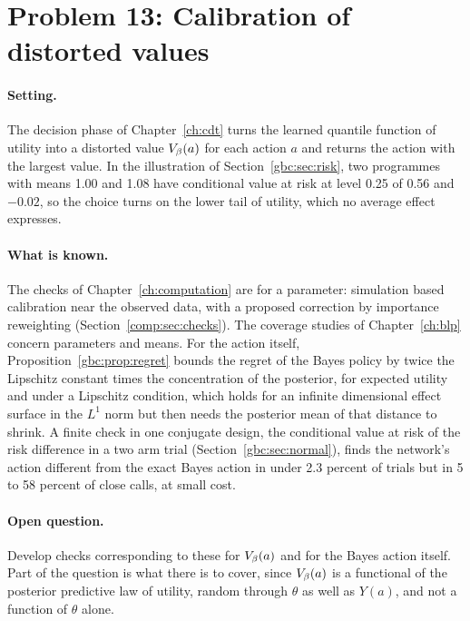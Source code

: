 \section{Problem 13: Calibration of distorted values}

\paragraph{Setting.} The decision phase of Chapter~\ref{ch:cdt} turns the learned quantile function of utility into a distorted value $V_{\beta}(a)$ for each action $a$ and returns the action with the largest value. In the illustration of Section~\ref{gbc:sec:risk}, two programmes with means 1.00 and 1.08 have conditional value at risk at level 0.25 of 0.56 and $-0.02$, so the choice turns on the lower tail of utility, which no average effect expresses.

\paragraph{What is known.} The checks of Chapter~\ref{ch:computation} are for a parameter: simulation based calibration near the observed data, with a proposed correction by importance reweighting (Section~\ref{comp:sec:checks}). The coverage studies of Chapter~\ref{ch:blp} concern parameters and means. For the action itself, Proposition~\ref{gbc:prop:regret} bounds the regret of the Bayes policy by twice the Lipschitz constant times the concentration of the posterior, for expected utility and under a Lipschitz condition, which holds for an infinite dimensional effect surface in the $L^1$ norm but then needs the posterior mean of that distance to shrink. A finite check in one conjugate design, the conditional value at risk of the risk difference in a two arm trial (Section~\ref{gbc:sec:normal}), finds the network's action different from the exact Bayes action in under 2.3 percent of trials but in 5 to 58 percent of close calls, at small cost.

\paragraph{Open question.} Develop checks corresponding to these for $V_{\beta}(a)$ and for the Bayes action itself. Part of the question is what there is to cover, since $V_{\beta}(a)$ is a functional of the posterior predictive law of utility, random through $\theta$ as well as $Y(a)$, and not a function of $\theta$ alone.

